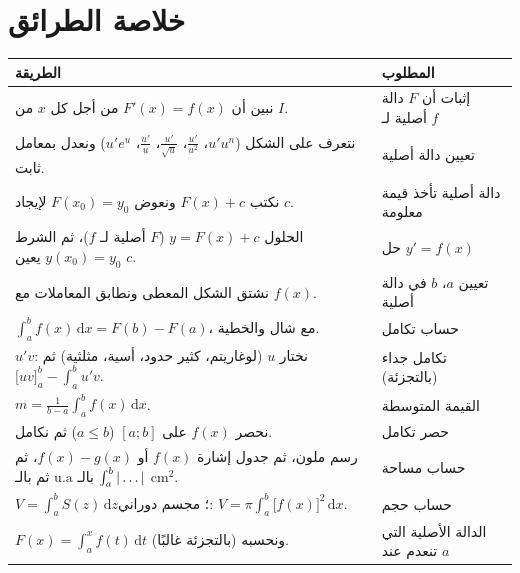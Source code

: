 \documentclass[12pt,a4paper]{article}
\renewcommand{\ldots}{\mathinner{\ldotp\ldotp\ldotp}}
\newcommand{\dx}{\,\mathrm{d}x}
\newcommand{\dt}{\,\mathrm{d}t}
\begin{document}
\section{خلاصة الطرائق}
\begin{center}
\renewcommand{\arraystretch}{1.3}
\begin{tabular}{|p{}|p{}|}\hline
\rowcolor{cSec!12}\textbf{الطريقة} & \textbf{المطلوب}\\\hline
نبين أن $F'(x)=f(x)$ من أجل كل $x$ من $I$. & إثبات أن $F$ دالة أصلية لـ $f$\\\hline
نتعرف على الشكل ($u'u^{n}$، $\frac{u'}{u^{2}}$، $\frac{u'}{\sqrt u}$، $\frac{u'}{u}$، $u'e^{u}$) ونعدل بمعامل ثابت. & تعيين دالة أصلية\\\hline
نكتب $F(x)+c$ ونعوض $F(x_0)=y_0$ لإيجاد $c$. & دالة أصلية تأخذ قيمة معلومة\\\hline
الحلول $y=F(x)+c$ ($F$ أصلية لـ $f$)، ثم الشرط $y(x_0)=y_0$ يعين $c$. & حل $y'=f(x)$\\\hline
نشتق الشكل المعطى ونطابق المعاملات مع $f(x)$. & تعيين $a$، $b$ في دالة أصلية\\\hline
$\int_a^b f(x)\dx=F(b)-F(a)$، مع شال والخطية. & حساب تكامل\\\hline
$u'v$: نختار $u$ (لوغاريتم، كثير حدود، أسية، مثلثية) ثم $\big[uv\big]_a^b-\int_a^b u'v$. & تكامل جداء (بالتجزئة)\\\hline
$m=\frac{1}{b-a}\int_a^b f(x)\dx$. & القيمة المتوسطة\\\hline
نحصر $f(x)$ على $[a;b]$ ($a\leqslant b$) ثم نكامل. & حصر تكامل\\\hline
رسم ملون، ثم جدول إشارة $f(x)$ أو $f(x)-g(x)$، ثم $\int_a^b|\ldots|$ بالـ $\mathrm{u.a}$ ثم بالـ $\mathrm{cm}^{2}$. & حساب مساحة\\\hline
$V=\int_a^b S(z)\,\mathrm{d}z$؛ مجسم دوراني: $V=\pi\int_a^b\big[f(x)\big]^{2}\dx$. & حساب حجم\\\hline
$F(x)=\int_a^x f(t)\dt$ ونحسبه (بالتجزئة غالبًا). & الدالة الأصلية التي تنعدم عند $a$\\\hline
\end{tabular}
\end{center}
\end{document}
